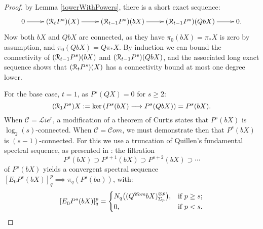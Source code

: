 \documentclass[11pt]{amsart} \renewcommand{\baselinestretch}{1.4}
\theoremstyle{plain}
\theoremstyle{definition}
\renewcommand{\ker}{\mathrm{ker}\,}
\renewcommand{\to}{\longrightarrow}
\newcommand{\scrL}{\mathscr{L}}
\newcommand{\scrC}{\mathscr{C}}
\newcommand{\calR}{\mathcal{R}}
\newcommand{\calc}{\mathcal{C}}
\newcommand{\citeBOX}[2][]{\cite[\mbox{#1}]{#2}}
\newcommand{\algs}{{\scrC\!\textit{om}}}
\newcommand{\restliealgs}{{\scrL\!\textit{ie}^\textit{r}}}
\newcommand{\algcat}{{\calc}}%
\newcommand{\E}[5]{[E^{#1}_{#2}#3]^{#4}_{#5}}
\newcommand{\caldup}[1]{\calR_{\smash{#1}}}
\newcommand{\barConstructionMightAbbreviate}{b}
\begin{document}
\begin{Bousfield-Kan spectral sequence}
\begin{proof}
by Lemma \ref{towerWithPowers}, there is a short exact sequence:
\[\xymatrix{
0\ar[r]&
(\caldup{t}P^{s})(X)\ar[r]&
(\caldup{t-1}P^{s})(\barConstructionMightAbbreviate X)\ar[r]&
(\caldup{t-1}P^{s})(Q\barConstructionMightAbbreviate X)\ar[r]&
0.
}\]
Now both $\barConstructionMightAbbreviate X$ and $Q\barConstructionMightAbbreviate X$ are connected, as they have $\pi_0(\barConstructionMightAbbreviate X)=\pi_*X$ is zero by assumption, and $\pi_0(Q\barConstructionMightAbbreviate X)=Q\pi_*X$. By induction we can bound the connectivity of $(\caldup{t-1}P^{s})(\barConstructionMightAbbreviate X)$ and $(\caldup{t-1}P^{s})(Q\barConstructionMightAbbreviate X)$, and the associated long exact sequence shows that $(\caldup{t}P^{s})(X)$ has a connectivity bound at most one degree lower.


For the base case, $t=1$, as $P^s(QX)=0$ for $s\geq2$:
\[(\caldup{1}P^{s})X:=\ker(P^{s}(\barConstructionMightAbbreviate X)\to P^{s}(Q\barConstructionMightAbbreviate X))=P^{s}(\barConstructionMightAbbreviate X).\]
When $\algcat=\restliealgs$, a modification \citeBOX[4.3]{6Author.pdf} of a theorem of Curtis \citeBOX[\S5]{Curtis_LCS.pdf} states that $P^{s}(\barConstructionMightAbbreviate X)$ is $\log_2(s)$-connected.
When $\algcat=\algs$, we must demonstrate then that $P^s(\barConstructionMightAbbreviate X)$ is $(s-1)$-connected. For this
 we use a truncation of Quillen's fundamental spectral sequence, as presented in \cite[Theorem 6.2]{MR1089001}: the filtration
\[P^s(\barConstructionMightAbbreviate X)\supset P^{s+1}(\barConstructionMightAbbreviate X)\supset P^{s+2}(\barConstructionMightAbbreviate X)\supset\cdots \]
of $P^s(\barConstructionMightAbbreviate X)$ yields a convergent spectral sequence  $\E{}{0}{P^s(\barConstructionMightAbbreviate X)}{p}{q}\implies \pi_q(P^s(\barConstructionMightAbbreviate a))$, with:
\[\E{}{0}{P^s(\barConstructionMightAbbreviate X)}{p}{q}=
\begin{cases}
N_q\bigl((Q^{\algs}\barConstructionMightAbbreviate X)^{\otimes p}_{\Sigma_p}\bigr),&\textup{if }p\geq s;\\
0,&\textup{if }p<s.
\end{cases}\]

\end{proof}
\end{Bousfield-Kan spectral sequence}
\end{document}

